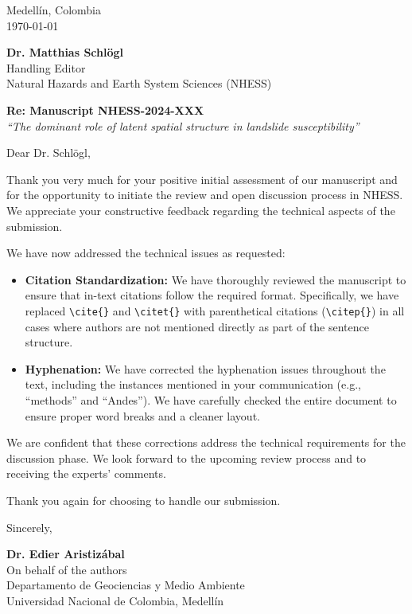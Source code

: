 \documentclass[11pt]{article}
\begin{document}
\begin{flushright}
    Medellín, Colombia \\
    \today
\end{flushright}

\vspace{1cm}

\begin{flushleft}
    \textbf{Dr. Matthias Schlögl} \\
    Handling Editor \\
    Natural Hazards and Earth System Sciences (NHESS)
\end{flushleft}

\vspace{0.5cm}

\noindent \textbf{Re: Manuscript NHESS-2024-XXX} \\
\textit{``The dominant role of latent spatial structure in landslide susceptibility''}

\vspace{1cm}

Dear Dr. Schlögl,

\vspace{0.5cm}

Thank you very much for your positive initial assessment of our manuscript and for the opportunity to initiate the review and open discussion process in NHESS. We appreciate your constructive feedback regarding the technical aspects of the submission.

We have now addressed the technical issues as requested:

\begin{itemize}
    \item \textbf{Citation Standardization:} We have thoroughly reviewed the manuscript to ensure that in-text citations follow the required format. Specifically, we have replaced \texttt{\textbackslash cite\{\}} and \texttt{\textbackslash citet\{\}} with parenthetical citations (\texttt{\textbackslash citep\{\}}) in all cases where authors are not mentioned directly as part of the sentence structure.
    \item \textbf{Hyphenation:} We have corrected the hyphenation issues throughout the text, including the instances mentioned in your communication (e.g., ``methods'' and ``Andes''). We have carefully checked the entire document to ensure proper word breaks and a cleaner layout.
\end{itemize}

We are confident that these corrections address the technical requirements for the discussion phase. We look forward to the upcoming review process and to receiving the experts' comments.

Thank you again for choosing to handle our submission.

\vspace{1.5cm}

Sincerely,

\vspace{1cm}

\textbf{Dr. Edier Aristizábal} \\
On behalf of the authors \\
Departamento de Geociencias y Medio Ambiente \\
Universidad Nacional de Colombia, Medellín
\end{document}
